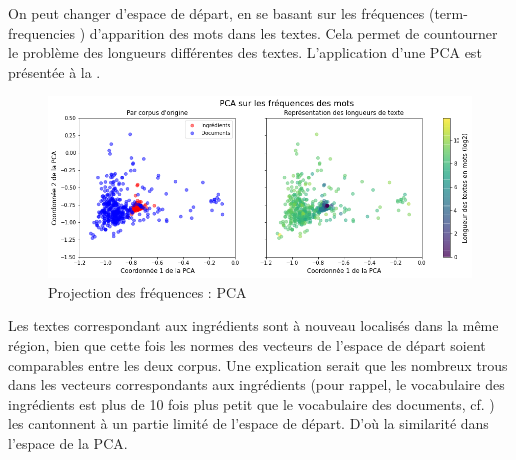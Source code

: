             On peut changer d'espace de départ, en se basant sur les fréquences (\og term-frequencies \fg) d'apparition des mots dans les textes. 
            Cela permet de countourner le problème des longueurs différentes des textes.
            L'application d'une PCA est présentée à la .
            \begin{figure}[htbp]
                \begin{center}
                \includegraphics[width=0.9\linewidth]{img/PCA_freq.png}
                \end{center}
                \caption{Projection des fréquences : PCA}
                \label{fig:PCA_freq}
            \end{figure}
            Les textes correspondant aux ingrédients sont à nouveau localisés dans la même région, bien que cette fois les normes des vecteurs de l'espace de départ soient comparables entre les deux corpus.
            Une explication serait que les nombreux \og trous \fg dans les vecteurs correspondants aux ingrédients (pour rappel, le vocabulaire des ingrédients est plus de 10 fois plus petit que le vocabulaire des documents, cf. ) les cantonnent à un partie limité de l'espace de départ.
            D'où la similarité dans l'espace de la PCA.


